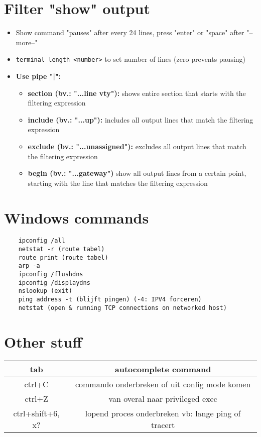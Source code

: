 \documentclass[10pt, a4paper]{article}
\begin{document}
	\section{Filter "show" output}
	\begin{itemize}[noitemsep,nolistsep]
		\item Show command "pauses" after every 24 lines, press "enter" or "space" after "--more--"
		\item \texttt{terminal length <number>} to set number of lines (zero prevents pausing)\\
		\item \textbf{Use pipe "|":}
		\begin{itemize}[noitemsep,nolistsep]
			\item \textbf{section (bv.: "...line vty"):} shows entire section that starts with the filtering expression
			\item \textbf{include (bv.: "...up"):} includes all output lines that match the filtering expression
			\item \textbf{exclude (bv.: "...unassigned"):} excludes all output lines that match the filtering expression
			\item \textbf{begin (bv.: "...gateway")} show all output lines from a certain point, starting with the line that matches the filtering expression\\
		\end{itemize}
	\end{itemize}
	
	\section{Windows commands}
	\begin{lstlisting}
	ipconfig /all
	netstat -r (route tabel)
	route print (route tabel)
	arp -a
	ipconfig /flushdns
	ipconfig /displaydns
	nslookup (exit)
	ping address -t (blijft pingen) (-4: IPV4 forceren)
	netstat (open & running TCP connections on networked host)
	\end{lstlisting}
	
	\section{Other stuff}
	\begin{tabular}{|c|c|}
		\hline \rule[-1ex]{0pt}{4ex} tab & autocomplete command \\
		\hline \rule[-1ex]{0pt}{4ex} ctrl+C  & commando onderbreken  of uit config mode komen\\ 
		\hline \rule[-1ex]{0pt}{4ex} ctrl+Z & van overal naar privileged exec\\ 
		\hline \rule[-1ex]{0pt}{4ex} ctrl+shift+6, x? & lopend proces onderbreken vb: lange ping of tracert\\ 
		\hline
	\end{tabular} \\ \\
	
\end{document}
